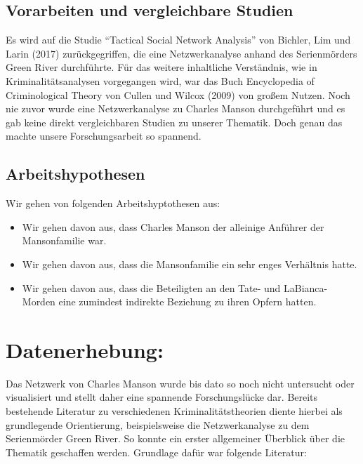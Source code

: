 \documentclass[
]{article}
\begin{document}
\hypertarget{vorarbeiten-und-vergleichbare-studien}{%
\subsection{Vorarbeiten und vergleichbare
Studien}\label{vorarbeiten-und-vergleichbare-studien}}

Es wird auf die Studie ``Tactical Social Network Analysis'' von Bichler,
Lim und Larin (2017) zurückgegriffen, die eine Netzwerkanalyse anhand
des Serienmörders Green River durchführte. Für das weitere inhaltliche
Verständnis, wie in Kriminalitätsanalysen vorgegangen wird, war das Buch
Encyclopedia of Criminological Theory von Cullen und Wilcox (2009) von
großem Nutzen. Noch nie zuvor wurde eine Netzwerkanalyse zu Charles
Manson durchgeführt und es gab keine direkt vergleichbaren Studien zu
unserer Thematik. Doch genau das machte unsere Forschungsarbeit so
spannend.

\hypertarget{arbeitshypothesen}{%
\subsection{Arbeitshypothesen}\label{arbeitshypothesen}}

Wir gehen von folgenden Arbeitshyptothesen aus:

\begin{itemize}
\item
  Wir gehen davon aus, dass Charles Manson der alleinige Anführer der
  Mansonfamilie war.
\item
  Wir gehen davon aus, dass die Mansonfamilie ein sehr enges Verhältnis
  hatte.
\item
  Wir gehen davon aus, dass die Beteiligten an den Tate- und
  LaBianca-Morden eine zumindest indirekte Beziehung zu ihren Opfern
  hatten.
\end{itemize}

\hypertarget{datenerhebung}{%
\section{Datenerhebung:}\label{datenerhebung}}

Das Netzwerk von Charles Manson wurde bis dato so noch nicht untersucht
oder visualisiert und stellt daher eine spannende Forschungslücke dar.
Bereits bestehende Literatur zu verschiedenen Kriminalitätstheorien
diente hierbei als grundlegende Orientierung, beispielsweise die
Netzwerkanalyse zu dem Serienmörder Green River. So konnte ein erster
allgemeiner Überblick über die Thematik geschaffen werden. Grundlage
dafür war folgende Literatur:
\end{document}
